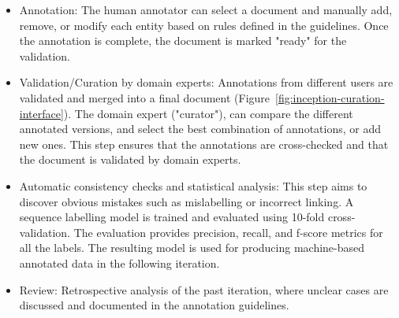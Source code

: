 \documentclass[fleqn,10pt]{wlscirep}
\begin{document}
\begin{itemize}
\item Annotation: The human annotator can select a document and manually add, remove, or modify each entity based on rules defined in the guidelines. Once the annotation is complete, the document is marked "ready" for the validation. 

\item Validation/Curation by domain experts: Annotations from different users are validated and merged into a final document (Figure~\ref{fig:inception-curation-interface}). 
The domain expert ("curator"), can compare the different annotated versions, and select the best combination of annotations, or add new ones. 
This step ensures that the annotations are cross-checked and that the document is validated by domain experts.

\item Automatic consistency checks and statistical analysis: This step aims to discover obvious mistakes such as mislabelling or incorrect linking. 
A sequence labelling model is trained and evaluated using 10-fold cross-validation. The evaluation provides precision, recall, and f-score metrics for all the labels.
The resulting model is used for producing machine-based annotated data in the following iteration.

\item Review: Retrospective analysis of the past iteration, where unclear cases are discussed and documented in the annotation guidelines. 

\end{itemize}
\end{document}
